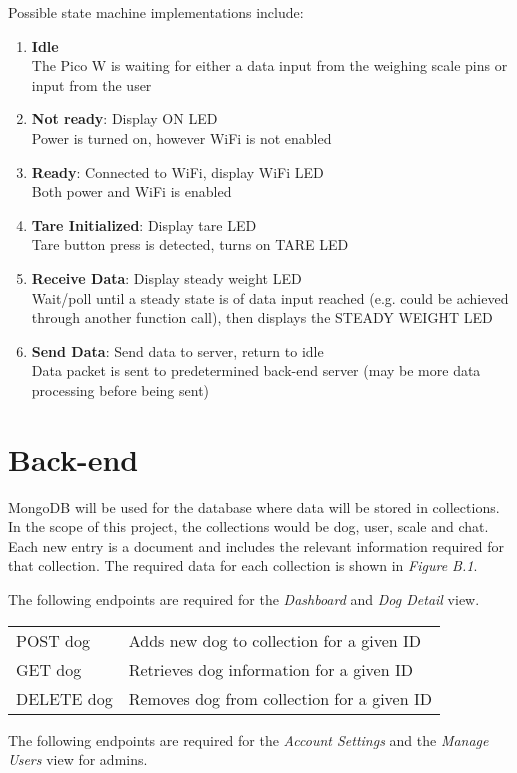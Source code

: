 Possible state machine implementations include:
\begin{enumerate}
\item \textbf{Idle}
\\The Pico W is waiting for either a data input from the weighing scale pins or input from the user
\item \textbf{Not ready}: Display ON LED
\\Power is turned on, however WiFi is not enabled
\item \textbf{Ready}: Connected to WiFi, display WiFi LED
\\Both power and WiFi is enabled
\item \textbf{Tare Initialized}: Display tare LED
\\Tare button press is detected, turns on TARE LED
\item \textbf{Receive Data}: Display steady weight LED
\\Wait/poll until a steady state is of data input reached (e.g. could be achieved through another function call), then displays the STEADY WEIGHT LED
\item \textbf{Send Data}: Send data to server, return to idle
\\Data packet is sent to predetermined back-end server (may be more data processing before being sent)
\end{enumerate}


\section{Back-end}
MongoDB will be used for the database where data will be stored in collections. In the scope of this project, the collections would be dog, user, scale and chat. Each new entry is a document and includes the relevant information required for that collection. The required data for each collection is shown in \textit{Figure B.1}.

The following endpoints are required for the \textit{Dashboard} and \textit{Dog Detail} view.

\begin{tabular}{l|l}
POST dog & Adds new dog to collection for a given ID\\
GET dog & Retrieves dog information for a given ID\\
DELETE dog & Removes dog from collection for a given ID\\
\end{tabular}

The following endpoints are required for the \textit{Account Settings} and the \textit{Manage Users} view for admins.

